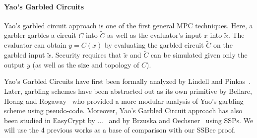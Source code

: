 \paragraph{Yao's Garbled Circuits}
Yao's garbled circuit approach is one of the first general MPC techniques.
Here, a garbler garbles a circuit $C$ into $\tilde{C}$ as well as the
evaluator's input $x$ into $\tilde{x}$. The evaluator can obtain
$y=C(x)$ by evaluating the garbled circuit $\tilde{C}$ on the garbled
input $\tilde{x}$. Security requires that $\tilde{x}$ and $\tilde{C}$
can be simulated given only the output $y$ (as well as the size and
topology of $C$).

Yao's Garbled Circuits have first been formally analyzed by Lindell and Pinkas~\cite{X}.
Later, garbling schemes have been abstracted out as its own primitive by 
Bellare, Hoang and Rogaway~\cite{X} who provided a more modular analysis of
Yao's garbling scheme using pseudo-code. Moreover, Yao's Garbled Circuit approach has also
been studied in EasyCrypt by ...~\cite{X} and by Brzuska and Oechsner~\cite{X}
using SSPs. We will use the 4 previous works as a base of comparison with our SSBee proof.

